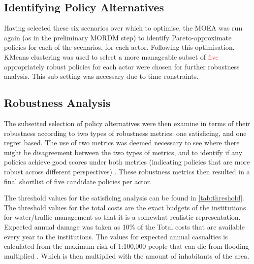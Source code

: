 \subsection{Identifying Policy Alternatives}
Having selected these six scenarios over which to optimise, the MOEA was run again (as in the preliminary MORDM step) to identify Pareto-approximate policies for each of the scenarios, for each actor. Following this optimisation, KMeans clustering was used to select a more manageable subset of \textcolor{red}{five} appropriately robust policies for each actor were chosen for further robustness analysis.  This sub-setting was necessary due to time constraints.



\subsection{Robustness Analysis}
The subsetted selection of policy alternatives were then examine in terms of their robustness according to two types of robustness metrics: one satisficing, and one regret based. The use of two metrics was deemed necessary to see where there might be disagreement between the two types of metrics, and to identify if any policies achieve good scores under both metrics (indicating  policies that are more robust across different perspectives) \parencite{mcphail_robustness_2018}. These robustness metrics then resulted in a final shortlist of five candidate policies per actor.

The threshold values for the satisficing analysis can be found in \autoref{tab:threshold}. The threshold values for the total costs are the exact budgets of the institutions for water/traffic management so that it is a somewhat realistic representation. Expected annual damage was taken as 10\% of the Total costs that are available every year to the institutions. The values for expected annual casualties is calculated from the maximum risk of 1:100,000 people that can die from flooding multiplied \parencite{slootjesandvandermost_2016} . Which is then multiplied with the amount of inhabitants of the area.


